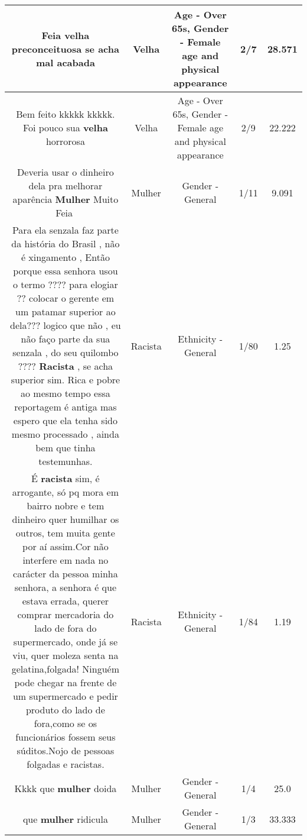 \documentclass[11pt]{article}
\newlength\mylength
\begin{document}
\begin{center}
\begin{longtable}{|C{.65\mylength}|C{.30\mylength}|C{.12\mylength}|C{.12\mylength}|C{.12\mylength}|}
  \small Feia \textbf{v\textbf{elha}} preconceituosa se acha mal acabada\normalsize   & Velha & Age - Over 65s, Gender - Female age and physical appearance & 2/7 & 28.571 \\  \hline
  \small Bem feito kkkkk kkkkk. Foi pouco sua \textbf{v\textbf{elha}} horrorosa\normalsize   & Velha & Age - Over 65s, Gender - Female age and physical appearance & 2/9 & 22.222 \\  \hline
  \small Deveria usar o dinheiro dela pra melhorar aparência \textbf{Mulher} Muito Feia🤮\normalsize   & Mulher & Gender - General & 1/11 & 9.091 \\  \hline
  \small Para ela senzala faz parte da história do Brasil , não é xingamento , Então porque essa senhora usou o termo ???? para elogiar ?? colocar o gerente em um patamar superior ao dela??? logico que não , eu não faço parte da sua senzala , do seu quilombo ???? \textbf{Racista} , se acha superior sim. Rica e pobre ao mesmo tempo essa reportagem é antiga mas espero que ela tenha sido mesmo processado , ainda bem que tinha testemunhas.\normalsize   & Racista & Ethnicity - General & 1/80 & 1.25 \\  \hline
  \small É \textbf{racista} sim, é arrogante, só pq mora em bairro nobre e tem dinheiro quer humilhar os outros, tem muita gente por aí assim.Cor não interfere em nada no carácter da pessoa minha senhora, a senhora é que estava errada, querer comprar mercadoria do lado de fora do supermercado, onde já se viu, quer moleza senta na gelatina,folgada! Ninguém pode chegar na frente de um supermercado e pedir produto do lado de fora,como se os funcionários fossem seus súditos.Nojo de pessoas folgadas e racistas.\normalsize   & Racista & Ethnicity - General & 1/84 & 1.19 \\  \hline
  \small Kkkk que \textbf{mulher} doida\normalsize   & Mulher & Gender - General & 1/4 & 25.0 \\  \hline
  \small que \textbf{mulher} ridicula\normalsize   & Mulher & Gender - General & 1/3 & 33.333 \\  \hline

\end{longtable}
\end{center}
\end{document}
